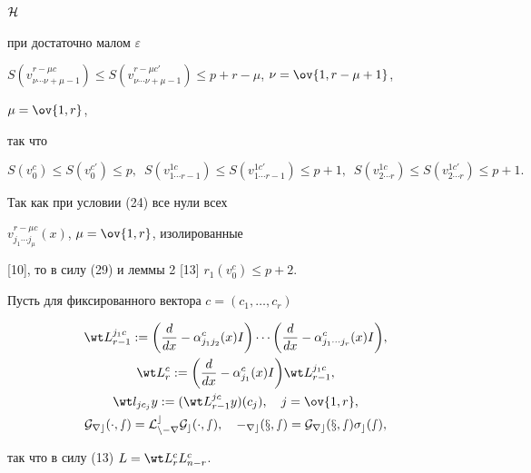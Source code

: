 \begin{pf}
$\cal H$ 


при достаточно малом $\varepsilon$\; 


$S(v^{r-\mu c}_{\nu\dotsb\nu+\mu-1})\le S(v^{r-\mu 


c'}_{\nu\dotsb\nu+\mu-1})\le p+r-\mu$, $\nu=\ov{1,r-\mu+1}$, 


$\mu=\ov{1,r}$, 


так что 


\begin{equation} 


S(v^c_0)\le S(v^{c'}_0)\le p, 


\ \; S(v^{1c}_{1\dotsb r-1})\le S(v^{1c'}_{1\dotsb r-1}) 


\le p+1, \ \; S(v^{1c}_{2\dotsb r})\le 


S(v^{1c'}_{2\dotsb r})\le p+1. 


\end{equation} 


Так как при условии (24) все нули всех 


$v^{r-\mu c}_{j_1\dotsb j_\mu}(x)$, $\mu=\ov{1,r}$, изолированные 


[10], то в силу (29) и леммы 2 [13] $r_1(v^c_0)\le p+2$. 


 


Пусть для фиксированного вектора $c=(c_1,\dotsc,c_r)$ 


\begin{gather} 


\wt L^{j_1c}_{r-1}:=\bigg(\frac{d}{dx}- 


\alpha^c_{j_1j_2}(x)I\bigg)\dotsb\bigg(\frac{d}{dx} 


-\alpha^c_{j_1\dotsb j_r}(x)I\bigg), \\ 


\wt L^c_r:=\bigg(\frac{d}{dx}-\alpha^c_{j_1}(x)I\bigg) 


\wt L^{j_1c}_{r-1},\\ 


\wt l_{j c_j}y:=(\wt L^{j c}_{r-1}y)(c_j),\quad j=\ov{1,r}, \\ 


\cal G_{r c}(\cdot,s)=L^c_{n-r}\cal G_c(\cdot,s),\quad 


\Gamma_{r c}(x,s)=\cal G_{r c}(x,s)\sigma_c(s), 


\end{gather} 


так что в силу (13) $L=\wt L^c_r L^c_{n-r}$. 



\end{pf}
